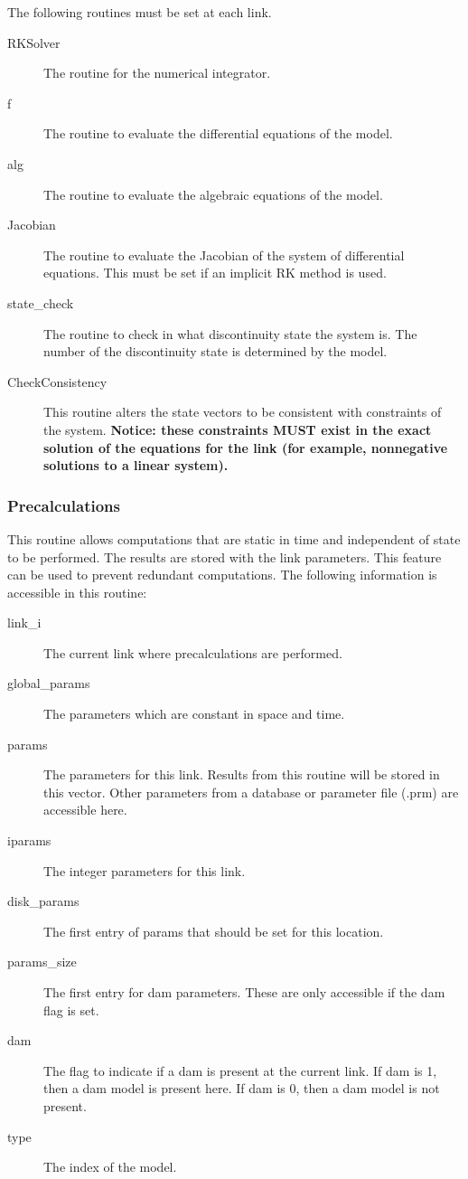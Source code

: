 \documentclass[12pt]{article}
\begin{document}
The following routines must be set at each link.

\begin{description}
 \item[RKSolver] The routine for the numerical integrator.
 \item[f] The routine to evaluate the differential equations of the model.
 \item[alg] The routine to evaluate the algebraic equations of the model.
 \item[Jacobian] The routine to evaluate the Jacobian of the system of differential equations. This must be set if an implicit RK method is used.
 \item[state\_check] The routine to check in what discontinuity state the system is. The number of the discontinuity state is determined by the model.
 \item[CheckConsistency] This routine alters the state vectors to be consistent with constraints of the system. \textbf{Notice: these constraints MUST exist in the exact solution of the equations for the link (for example, nonnegative solutions to a linear system).}
\end{description}


\subsubsection{Precalculations} \label{sec: precalculations}

This routine allows computations that are static in time and independent of state to be performed. The results are stored with the link parameters. This feature can be used to prevent redundant computations. The following information is accessible in this routine:

\begin{description}
 \item[link\_i] The current link where precalculations are performed.
 \item[global\_params] The parameters which are constant in space and time.
 \item[params] The parameters for this link. Results from this routine will be stored in this vector. Other parameters from a database or parameter file (.prm) are accessible here.
 \item[iparams] The integer parameters for this link.
 \item[disk\_params] The first entry of params that should be set for this location.
 \item[params\_size] The first entry for dam parameters. These are only accessible if the dam flag is set.
 \item[dam] The flag to indicate if a dam is present at the current link. If dam is 1, then a dam model is present here. If dam is 0, then a dam model is not present.
 \item[type] The index of the model.
\end{description}
\end{document}
